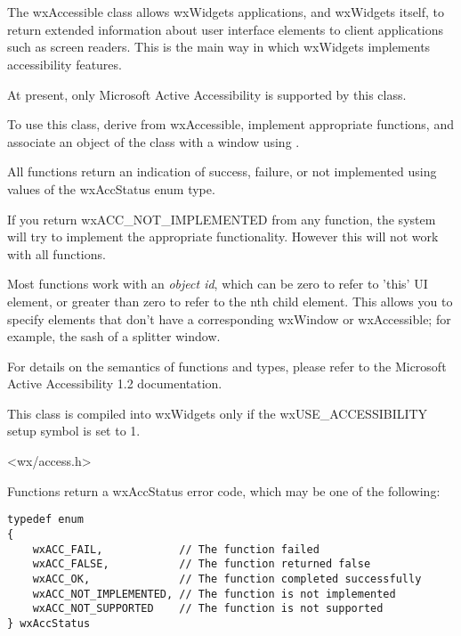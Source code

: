 %
%

\section{}\label{wxaccessible}

The wxAccessible class allows wxWidgets applications, and
wxWidgets itself, to return extended information about user interface elements
to client applications such as screen readers. This is the
main way in which wxWidgets implements accessibility features.

At present, only Microsoft Active Accessibility is supported
by this class.

To use this class, derive from wxAccessible, implement appropriate
functions, and associate an object of the class with a
window using .

All functions return an indication of success, failure, or not implemented
using values of the wxAccStatus enum type.

If you return wxACC\_NOT\_IMPLEMENTED from any function, the system will try to
implement the appropriate functionality. However this will not work with
all functions.

Most functions work with an {\it object id}, which can be zero to refer to
'this' UI element, or greater than zero to refer to the nth child element.
This allows you to specify elements that don't have a corresponding wxWindow or
wxAccessible; for example, the sash of a splitter window.

For details on the semantics of functions and types, please refer to the
Microsoft Active Accessibility 1.2 documentation.

This class is compiled into wxWidgets only if the wxUSE\_ACCESSIBILITY setup
symbol is set to 1.




<wx/access.h>


Functions return a wxAccStatus error code, which
may be one of the following:

{\small 
\begin{verbatim}
typedef enum
{
    wxACC_FAIL,            // The function failed
    wxACC_FALSE,           // The function returned false
    wxACC_OK,              // The function completed successfully
    wxACC_NOT_IMPLEMENTED, // The function is not implemented
    wxACC_NOT_SUPPORTED    // The function is not supported
} wxAccStatus
\end{verbatim}
}


